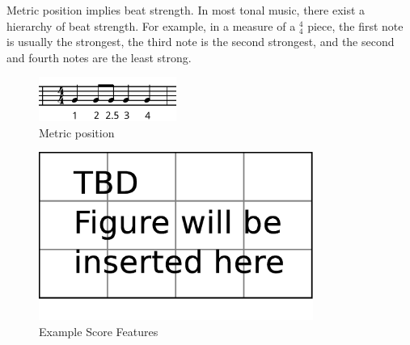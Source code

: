 \begin{description}
      Metric position implies beat strength. In most tonal music, there exist a hierarchy of beat strength\cite{?Beat strength}. For example, in a measure of a $^4_4$ piece, the first note is usually the strongest, the third note is the second strongest, and the second and fourth notes are the least strong.

   \begin{figure}[tp]
      \begin{center}
         \includegraphics[width=0.4\textwidth]{fig/metrical}
      \end{center}
      \caption{Metric position}
      \label{fig:metrical}
   \end{figure}
      \end{description}

   \begin{figure}[tp]
      \begin{center}
         \includegraphics[width=0.8\textwidth]{fig/TBDFigure}
      \end{center}
      \caption{Example Score Features}
      \label{fig:expScoreFeat}
   \end{figure}



